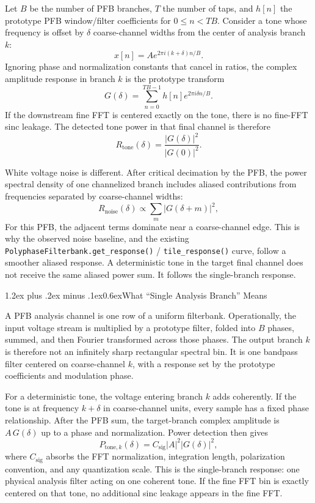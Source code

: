 \documentclass[10pt]{article}
\makeatletter
\renewcommand{\emph}[1]{#1}
\renewcommand\section{\@startsection{section}{1}{0pt}%
  {1.2ex plus .2ex minus .1ex}{0.6ex}{\normalsize\bfseries}}
\makeatother
\begin{document}
Let $B$ be the number of PFB branches, $T$ the number of taps, and $h[n]$ the
prototype PFB window/filter coefficients for $0 \leq n < TB$.  Consider a tone
whose frequency is offset by $\delta$ coarse-channel widths from the center of
analysis branch $k$:
\[
    x[n] = A e^{2\pi i (k+\delta)n/B}.
\]
Ignoring phase and normalization constants that cancel in ratios, the complex
amplitude response in branch $k$ is the prototype transform
\[
    G(\delta) = \sum_{n=0}^{TB-1} h[n] e^{2\pi i \delta n/B}.
\]
If the downstream fine FFT is centered exactly on the tone, there is no fine-FFT
sinc leakage.  The detected tone power in that final channel is therefore
\[
    R_{\mathrm{tone}}(\delta)
    = \frac{|G(\delta)|^2}{|G(0)|^2}.
\]

White voltage noise is different.  After critical decimation by the PFB, the
power spectral density of one channelized branch includes aliased contributions
from frequencies separated by coarse-channel widths:
\[
    R_{\mathrm{noise}}(\delta)
    \propto \sum_m |G(\delta + m)|^2 ,
\]
For this PFB, the adjacent terms dominate near a coarse-channel edge.  This is
why the observed noise baseline, and the existing
\texttt{PolyphaseFilterbank.get\_response()} / \texttt{tile\_response()} curve,
follow a smoother aliased response.  A deterministic tone in the target final
channel does not receive the same aliased power sum.  It follows the
single-branch response.

\section{What ``Single Analysis Branch'' Means}

A PFB analysis channel is one row of a uniform filterbank.  Operationally, the
input voltage stream is multiplied by a prototype filter, folded into
$B$ phases, summed, and then Fourier transformed across those phases.  The
output branch $k$ is therefore not an infinitely sharp rectangular spectral bin.
It is one bandpass filter centered on coarse-channel $k$, with a response set by
the prototype coefficients and modulation phase.

For a deterministic tone, the voltage entering branch $k$ adds coherently.  If
the tone is at frequency $k+\delta$ in coarse-channel units, every sample has a
fixed phase relationship.  After the PFB sum, the target-branch complex
amplitude is $A\,G(\delta)$ up to a phase and normalization.  Power detection
then gives
\[
    P_{\mathrm{tone},k}(\delta)
    = C_{\mathrm{sig}} |A|^2 |G(\delta)|^2 ,
\]
where $C_{\mathrm{sig}}$ absorbs the FFT normalization, integration length,
polarization convention, and any quantization scale.  This is the
\emph{single-branch} response: one physical analysis filter acting on one
coherent tone.  If the fine FFT bin is exactly centered on that tone, no
additional sinc leakage appears in the fine FFT.
\end{document}
